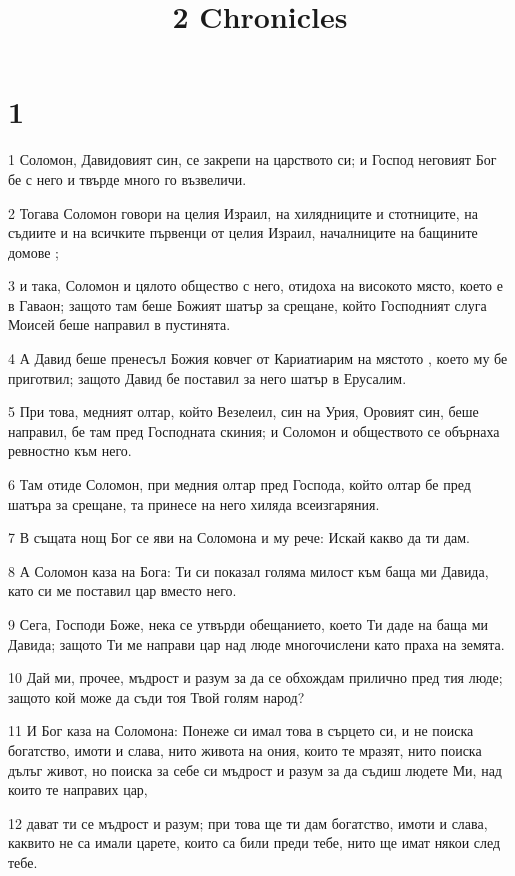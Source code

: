 

\title{2 Chronicles}


\chapter{1}

\par 1 Соломон, Давидовият син, се закрепи на царството си; и Господ неговият Бог бе с него и твърде много го възвеличи.
\par 2 Тогава Соломон говори на целия Израил, на хилядниците и стотниците, на съдиите и на всичките първенци от целия Израил, началниците на бащините домове ;
\par 3 и така, Соломон и цялото общество с него, отидоха на високото място, което е в Гаваон; защото там беше Божият шатър за срещане, който Господният слуга Моисей беше направил в пустинята.
\par 4 А Давид беше пренесъл Божия ковчег от Кариатиарим на мястото , което му бе приготвил; защото Давид бе поставил за него шатър в Ерусалим.
\par 5 При това, медният олтар, който Везелеил, син на Урия, Оровият син, беше направил, бе там пред Господната скиния; и Соломон и обществото се обърнаха ревностно към него.
\par 6 Там отиде Соломон, при медния олтар пред Господа, който олтар бе пред шатъра за срещане, та принесе на него хиляда всеизгаряния.
\par 7 В същата нощ Бог се яви на Соломона и му рече: Искай какво да ти дам.
\par 8 А Соломон каза на Бога: Ти си показал голяма милост към баща ми Давида, като си ме поставил цар вместо него.
\par 9 Сега, Господи Боже, нека се утвърди обещанието, което Ти даде на баща ми Давида; защото Ти ме направи цар над люде многочислени като праха на земята.
\par 10 Дай ми, прочее, мъдрост и разум за да се обхождам прилично пред тия люде; защото кой може да съди тоя Твой голям народ?
\par 11 И Бог каза на Соломона: Понеже си имал това в сърцето си, и не поиска богатство, имоти и слава, нито живота на ония, които те мразят, нито поиска дълъг живот, но поиска за себе си мъдрост и разум за да съдиш людете Ми, над които те направих цар,
\par 12 дават ти се мъдрост и разум; при това ще ти дам богатство, имоти и слава, каквито не са имали царете, които са били преди тебе, нито ще имат някои след тебе.
